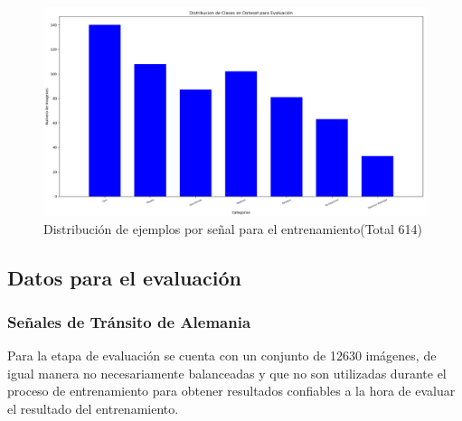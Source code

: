 			\begin{figure}[H]
				\begin{center}
				\includegraphics[width=1\textwidth]{images/desarrollo/histograms/inicioTrain614}
				\end{center}
				\begin{center}
				\caption{\small{Distribución de ejemplos por señal para el entrenamiento(Total 614)}}
				\vspace{-1em}
			{\small{\fontsize{10}{16.8}\selectfont {Fuente propia}}}
				\end{center}
				\vspace{-1.5em}
			\end{figure}

			

	\subsection{Datos para el evaluación}

		\subsubsection{Señales de Tránsito de Alemania}
		Para la etapa de evaluación se cuenta con un conjunto de 12630 imágenes, de igual manera no necesariamente balanceadas y que no son utilizadas durante el proceso de entrenamiento para obtener resultados confiables a la hora de evaluar el resultado del entrenamiento. 

